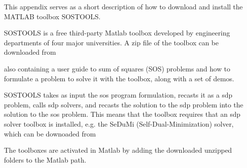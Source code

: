 This appendix serves as a short description of how to download and install the MATLAB toolbox SOSTOOLS.

SOSTOOLS is a free third-party Matlab toolbox developed by engineering departments of four major universities. A zip file of the toolbox can be downloaded from 

\hspace{1cm} {}

also containing a user guide \citep{bib:sostools_manual} to sum of squares (SOS) problems and how to formulate a problem to solve it with the toolbox, along with a set of demos. 

SOSTOOLS takes as input the \gls{sos} program formulation, recasts it as a \gls{sdp} problem, calls \gls{sdp} solvers, and recasts the solution to the \gls{sdp} problem into the solution to the \gls{sos} problem. This means that the toolbox requires that an \gls{sdp} solver toolbox is installed, e.g. the SeDuMi (Self-Dual-Minimization) solver, which can be downoaded from

\hspace{1cm} {}

The toolboxes are activated in Matlab by adding the downloaded unzipped folders to the Matlab path.
